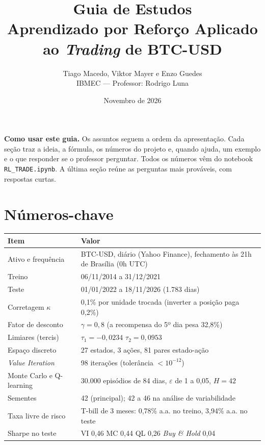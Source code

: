 \documentclass[11pt,a4paper]{article}
\title{\textbf{Guia de Estudos}\\[4pt]
\large Aprendizado por Reforço Aplicado ao \textit{Trading} de BTC-USD}
\author{Tiago Macedo, Viktor Mayer e Enzo Guedes\\
\small IBMEC --- Professor: Rodrigo Luna}
\date{Novembro de 2026}
\begin{document}
\maketitle

\textbf{Como usar este guia.} Os assuntos seguem a ordem da apresentação. Cada seção traz a ideia, a fórmula, os números do projeto e, quando ajuda, um exemplo e o que responder se o professor perguntar. Todos os números vêm do notebook \texttt{RL\_TRADE.ipynb}. A última seção reúne as perguntas mais prováveis, com respostas curtas.

\tableofcontents

\section*{Números-chave}

\begin{center}
\small
\begin{tabular}{l L{10.6cm}}
  \toprule
  \textbf{Item} & \textbf{Valor} \\
  \midrule
  Ativo e frequência        & BTC-USD, diário (Yahoo Finance), fechamento às 21h de Brasília (0h UTC) \\
  Treino                    & 06/11/2014 a 31/12/2021 \\
  Teste                     & 01/01/2022 a 18/11/2026 (1.783 dias) \\
  Corretagem $\kappa$       & 0,1\% por unidade trocada (inverter a posição paga 0,2\%) \\
  Fator de desconto         & $\gamma = 0{,}8$ (a recompensa do 5º dia pesa 32,8\%) \\
  Limiares (tercis)         & $\tau_1 = -0{,}0234$ \quad $\tau_2 = 0{,}0953$ \\
  Espaço discreto           & 27 estados, 3 ações, 81 pares estado-ação \\
  \textit{Value Iteration}  & 98 iterações (tolerância $< 10^{-12}$) \\
  Monte Carlo e Q-learning  & 30.000 episódios de 84 dias, $\varepsilon$ de 1 a 0,05, $H = 42$ \\
  Sementes                  & 42 (principal); 42 a 46 na análise de variabilidade \\
  Taxa livre de risco       & T-bill de 3 meses: 0,78\% a.a. no treino, 3,94\% a.a. no teste \\
  Sharpe no teste           & VI 0,46 \quad MC 0,44 \quad QL 0,26 \quad \textit{Buy \& Hold} 0,04 \\
  \bottomrule
\end{tabular}
\end{center}
\end{document}
